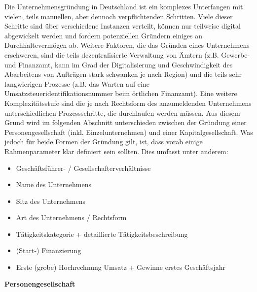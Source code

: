 Die Unternehmensgründung in Deutschland ist ein komplexes Unterfangen mit vielen, teils manuellen, aber dennoch verpflichtenden Schritten. Viele dieser Schritte sind über verschiedene Instanzen verteilt, können nur teilweise digital abgewickelt werden und fordern potenziellen Gründern einiges an Durchhaltevermögen ab. Weitere Faktoren, die das Gründen eines Unternehmens erschweren, sind die teils dezentralisierte Verwaltung von Ämtern (z.B. Gewerbe- und Finanzamt, kann im Grad der Digitalisierung und Geschwindigkeit des Abarbeitens von Aufträgen stark schwanken je nach Region) und die teils sehr langwierigen Prozesse (z.B. das Warten auf eine Umsatzsteueridentifikationsnummer beim örtlichen Finanzamt). Eine weitere Komplexitätsstufe sind die je nach Rechtsform des anzumeldenden Unternehmens unterschiedlichen Prozessschritte, die durchlaufen werden müssen. Aus diesem Grund wird im folgenden Abschnitt unterschieden zwischen der Gründung einer Personengesellschaft (inkl. Einzelunternehmen) und einer Kapitalgesellschaft. Was jedoch für beide Formen der Gründung gilt, ist, dass vorab einige Rahmenparameter klar definiert sein sollten. Dies umfasst unter anderem: 

\begin{itemize}
    \item Geschäftsführer- / Gesellschafterverhältnisse
    \item Name des Unternehmens
    \item Sitz des Unternehmens
    \item Art des Unternehmens / Rechtsform
    \item Tätigkeitskategorie + detaillierte Tätigkeitsbeschreibung
    \item (Start-) Finanzierung
    \item Erste (grobe) Hochrechnung Umsatz + Gewinne erstes Geschäftsjahr
\end{itemize} 

\textbf{Personengesellschaft}

